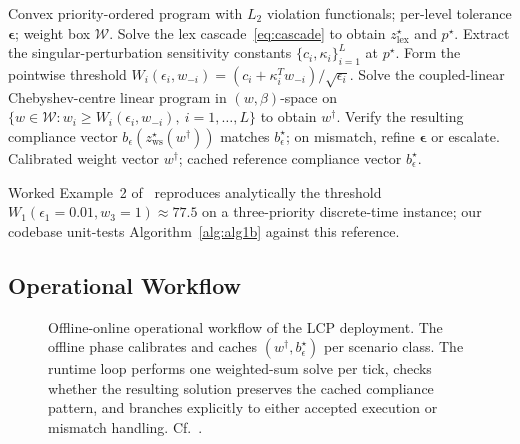 \begin{algorithm}[t]
\caption{$L_2$ tolerance-compliance calibration~\cite[\S9.4]{lcp2025}}
\label{alg:alg1b}
\begin{algorithmic}[1]
\Require Convex priority-ordered program with $L_2$ violation functionals; per-level tolerance $\boldsymbol{\epsilon}$; weight box $\mathcal{W}$.
\State Solve the lex cascade~\eqref{eq:cascade} to obtain $z_{\mathrm{lex}}^{\star}$ and $p^{\star}$.
\State Extract the singular-perturbation sensitivity constants $\{c_i, \kappa_i\}_{i=1}^{L}$ at $p^{\star}$.
\State Form the pointwise threshold $W_i(\epsilon_i, w_{-i}) = (c_i + \kappa_i^{T} w_{-i}) / \sqrt{\epsilon_i}$.
\State Solve the coupled-linear Chebyshev-centre linear program in $(w, \beta)$-space on $\{w \in \mathcal{W} : w_i \geq W_i(\epsilon_i, w_{-i}),\ i = 1, \ldots, L\}$ to obtain $w^{\dagger}$.
\State Verify the resulting compliance vector $b_{\epsilon}(z_{\mathrm{ws}}^{\star}(w^{\dagger}))$ matches $b_{\epsilon}^{\star}$; on mismatch, refine $\boldsymbol{\epsilon}$ or escalate.
\Ensure Calibrated weight vector $w^{\dagger}$; cached reference compliance vector $b_{\epsilon}^{\star}$.
\end{algorithmic}
\end{algorithm}

Worked Example~2 of~\cite[\S11.2]{lcp2025} reproduces analytically the threshold $W_1(\epsilon_1 = 0.01, w_3 = 1) \approx 77.5$ on a three-priority discrete-time instance; our codebase unit-tests Algorithm~\ref{alg:alg1b} against this reference.

\subsection{Operational Workflow}
\label{sec:foundations:state-machine}

\begin{figure}[t]
    \centering
    
    \caption{Offline-online operational workflow of the LCP deployment. The offline phase calibrates and caches $(w^{\dagger}, b_{\epsilon}^{\star})$ per scenario class. The runtime loop performs one weighted-sum solve per tick, checks whether the resulting solution preserves the cached compliance pattern, and branches explicitly to either accepted execution or mismatch handling. Cf.~\cite[Fig.~B4]{lcp2025}.}
    \label{fig:state_machine}
\end{figure}

